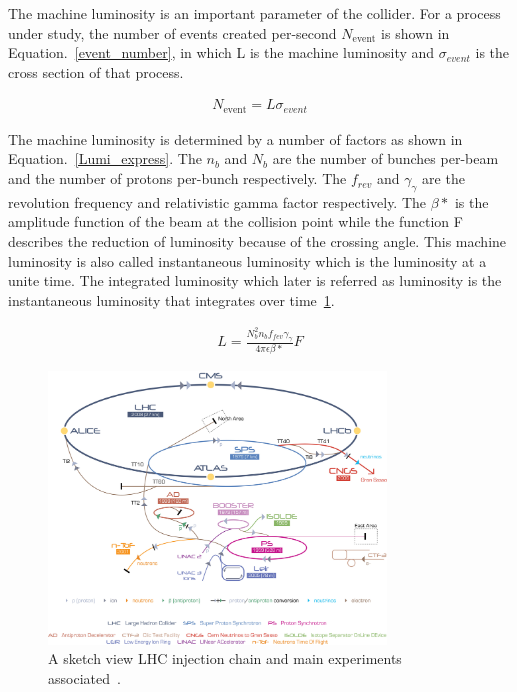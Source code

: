 The machine luminosity is an important parameter of the collider. For a process under study, the number of events created per-second $N_{\textrm{event}}$ is shown in Equation.~\ref{event_number}, in which L is the machine luminosity and $\sigma_{event}$ is the cross section of that process.

\begin{align}\label{event_number}
N_{\textrm{event}}=L\sigma_{event}
\end{align}

The machine luminosity is determined by a number of factors as shown in Equation.~\ref{Lumi_express}. The $n_b$ and $N_{b}$ are the number of bunches per-beam and the number of protons per-bunch respectively. The $f_{rev}$ and $\gamma_{\gamma}$ are the revolution frequency and relativistic gamma factor respectively. The $\beta*$ is the amplitude function of the beam at the collision point while the function F describes the reduction of luminosity because of the crossing angle. This machine luminosity is also called instantaneous luminosity which is the luminosity at a unite time. The integrated luminosity which later is referred as luminosity is the instantaneous luminosity that integrates over time~\ref{fig:LHC_sketch}.  

\begin{align}\label{Lumi_express}
L=\frac{N_{b}^{2}n_{b}f_{fev}\gamma_{\gamma}}{4\pi\epsilon\beta*}F
\end{align}



\begin{figure}[htbp] 
\centering
\includegraphics[width=0.8\textwidth]{chapter3/LHC_chain.jpg}
\caption{A sketch view LHC injection chain and main experiments associated~\cite{Christiane:1260465}.}
\label{fig:LHC_sketch}
\end{figure}


